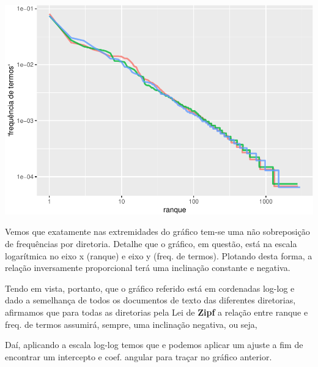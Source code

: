 \documentclass[]{article}
\newenvironment{Shaded}{\begin{snugshade}}{\end{snugshade}}
\newcommand{\KeywordTok}[1]{\textcolor[rgb]{0.13,0.29,0.53}{\textbf{#1}}}
\newcommand{\DataTypeTok}[1]{\textcolor[rgb]{0.13,0.29,0.53}{#1}}
\newcommand{\FloatTok}[1]{\textcolor[rgb]{0.00,0.00,0.81}{#1}}
\newcommand{\StringTok}[1]{\textcolor[rgb]{0.31,0.60,0.02}{#1}}
\newcommand{\CommentTok}[1]{\textcolor[rgb]{0.56,0.35,0.01}{\textit{#1}}}
\newcommand{\OtherTok}[1]{\textcolor[rgb]{0.56,0.35,0.01}{#1}}
\newcommand{\OperatorTok}[1]{\textcolor[rgb]{0.81,0.36,0.00}{\textbf{#1}}}
\newcommand{\NormalTok}[1]{#1}
\begin{document}
\begin{Shaded}
\end{Shaded}

\includegraphics{markdown_v41_test_files/figure-latex/unnamed-chunk-31-1.pdf}

Vemos que exatamente nas extremidades do gráfico tem-se uma não
sobreposição de frequências por diretoria. Detalhe que o gráfico, em
questão, está na escala logarítmica no eixo x (ranque) e eixo y (freq.
de termos). Plotando desta forma, a relação inversamente proporcional
terá uma inclinação constante e negativa.

Tendo em vista, portanto, que o gráfico referido está em cordenadas
log-log e dado a semelhança de todos os documentos de texto das
diferentes diretorias, afirmamos que para todas as diretorias pela Lei
de \textbf{Zipf} a relação entre ranque e freq. de termos assumirá,
sempre, uma inclinação negativa, ou seja,

Daí, aplicando a escala log-log temos que e podemos aplicar um ajuste a
fim de encontrar um intercepto e coef. angular para traçar no gráfico
anterior.
\end{document}
